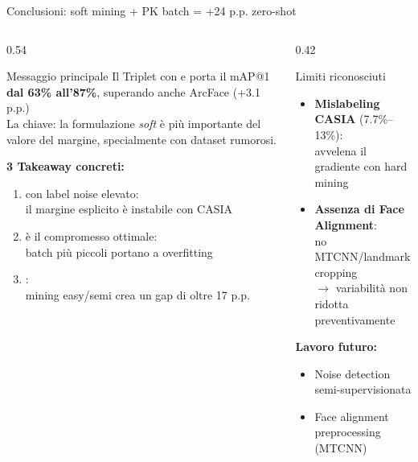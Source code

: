 \documentclass[aspectratio=169, 10pt]{beamer}
\begin{document}
\begin{frame}{Conclusioni: soft mining + PK batch = +24 p.p. zero-shot}
\vspace*{-0.35cm}
\begin{columns}[T, onlytextwidth]

\begin{column}{0.54\textwidth}
    \begin{exampleblock}{Messaggio principale}
        \small
        Il Triplet con  e  porta il mAP@1
        \textbf{dal 63\% all'87\%}, superando anche ArcFace
        (+3.1 p.p.)\\[0.3em]
        La chiave: la formulazione \emph{soft} è più importante
        del valore del margine, specialmente con dataset rumorosi.
    \end{exampleblock}

    \medskip
    \textbf{3 Takeaway concreti:}
    \begin{enumerate}
        \item {} con label noise elevato:\\
              il margine esplicito è instabile con CASIA
        \item {} è il compromesso ottimale:\\
              batch più piccoli portano a overfitting
        \item {}:\\
              mining easy/semi crea un gap di oltre 17 p.p.
    \end{enumerate}
\end{column}

\begin{column}{0.42\textwidth}
    \begin{alertblock}{\warn{[!]} Limiti riconosciuti}
        \small
        \begin{itemize}
            \item \textbf{Mislabeling CASIA} (7.7\%–13\%):\\
                  avvelena il gradiente con hard mining
            \item \textbf{Assenza di Face Alignment}:\\
                  no MTCNN/landmark cropping\\
                  $\to$ variabilità non ridotta preventivamente
        \end{itemize}
    \end{alertblock}

    \medskip
    \textbf{Lavoro futuro:}
    \begin{itemize}
        \item Noise detection semi-supervisionata
        \item Face alignment preprocessing (MTCNN)
    \end{itemize}
\end{column}

\end{columns}
\end{frame}
\end{document}

